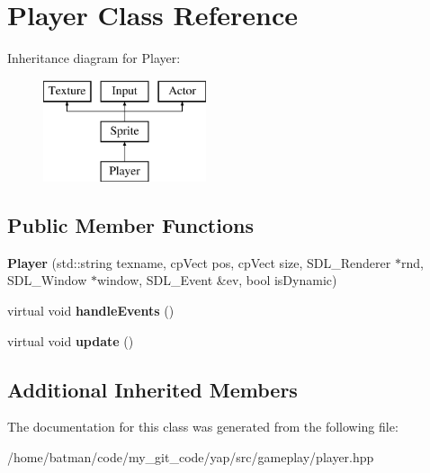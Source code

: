 \hypertarget{classPlayer}{}\section{Player Class Reference}
\label{classPlayer}
Inheritance diagram for Player\+:\begin{figure}[H]
\begin{center}
\leavevmode
\includegraphics[height=3.000000cm]{classPlayer}
\end{center}
\end{figure}
\subsection*{Public Member Functions}
\begin{DoxyCompactItemize}
\item 
\hypertarget{classPlayer_a1a4c1ee6f4388d60ade10274b551a266}{}{\bfseries Player} (std\+::string texname, cp\+Vect pos, cp\+Vect size, S\+D\+L\+\_\+\+Renderer $\ast$rnd, S\+D\+L\+\_\+\+Window $\ast$window, S\+D\+L\+\_\+\+Event \&ev, bool is\+Dynamic)\label{classPlayer_a1a4c1ee6f4388d60ade10274b551a266}

\item 
\hypertarget{classPlayer_aec1745c553b40fdb8a8d475668ff5dc8}{}virtual void {\bfseries handle\+Events} ()\label{classPlayer_aec1745c553b40fdb8a8d475668ff5dc8}

\item 
\hypertarget{classPlayer_acfbff530f5b4a879ca77241dbcc8d948}{}virtual void {\bfseries update} ()\label{classPlayer_acfbff530f5b4a879ca77241dbcc8d948}

\end{DoxyCompactItemize}
\subsection*{Additional Inherited Members}


The documentation for this class was generated from the following file\+:\begin{DoxyCompactItemize}
\item 
/home/batman/code/my\+\_\+git\+\_\+code/yap/src/gameplay/player.\+hpp\end{DoxyCompactItemize}

